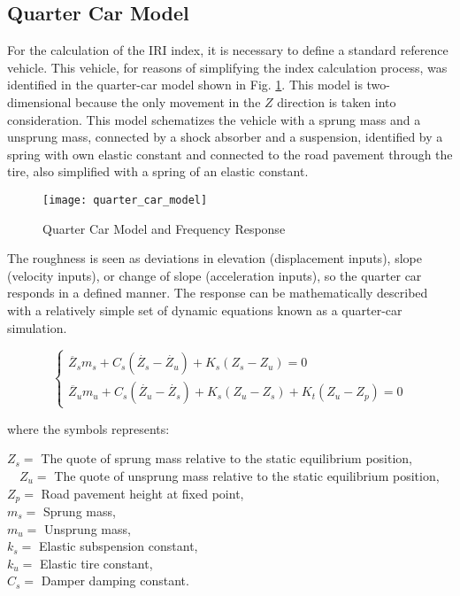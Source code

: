 \documentclass[tesi]{subfiles}
\begin{document}
\subsection{Quarter Car Model}\label{ssc:Quarter Car Model}
For the calculation of the IRI index, it is necessary to define a standard reference vehicle\cite{little_book}. This vehicle, for reasons of simplifying the index calculation process, was identified in the quarter-car model shown in Fig. \ref{fig:Quarter Car Model}. This model is two-dimensional because the only
movement in the $Z$ direction is taken into consideration. This model schematizes the vehicle with a sprung mass and a unsprung mass, connected by a shock absorber and a suspension, identified by a spring with own elastic constant and connected to the road pavement through the tire, also simplified with a spring of an elastic constant\cite{little_book}.

\begin{figure}[H]
\centering
\texttt{[image: quarter\_car\_model]}
\caption{Quarter Car Model and Frequency Response}

\label{fig:Quarter Car Model}
\end{figure}

The roughness is seen as deviations in elevation\cite{gillespie1992everything} (displacement inputs), slope (velocity inputs), or change of slope (acceleration inputs), so the quarter car responds in a defined manner. The response can be mathematically described with a relatively simple set
of dynamic equations known as a quarter-car simulation.


\begin{center}

\[
    \left\{
                \begin{array}{ll}
                  \ddot{Z_{s}} m_{s} + C_{s} ( \dot{Z_{s}} - \dot{Z_{u}} ) + K_{s} (Z_{s} - Z_{u}) = 0\\
                   \ddot{Z_{u}} m_{u} + C_{s} ( \dot{Z_{u}} - \dot{Z_{s}}) + K_{s} (Z_{u} - Z_{s}) + K_{t} ( Z_{u} - Z_{p} ) = 0
                \end{array}
              \right.
\]




\end{center}

where the symbols represents:

$ Z_{s} =  $ The quote of sprung mass relative to the static equilibrium position,\\
$\quad Z_{u} =  $ The quote of unsprung mass relative to the static equilibrium position,\\
$ Z_{p} = $ Road pavement height at fixed point,\\
$ m_{s} = $ Sprung mass,	\\
$ m_{u} = $ Unsprung mass, \\
$ k_{s} = $ Elastic subspension constant, \\
$ k_{u} = $ Elastic tire constant, \\
$C_{s} = $ Damper damping constant.\\
\end{document}
